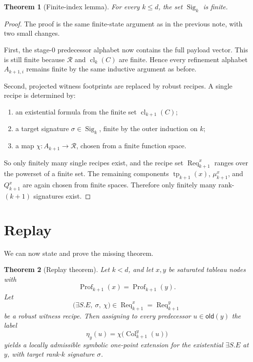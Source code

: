 \documentclass[11pt]{article}
\newtheorem{theorem}{Theorem}[section]
\theoremstyle{definition}
\newcommand{\Roles}{\mathcal{R}}
\newcommand{\cld}[2]{\operatorname{cl}_{#1}(#2)}
\newcommand{\tp}{\operatorname{tp}}
\newcommand{\Prof}{\operatorname{Prof}}
\newcommand{\older}{\mathsf{old}}
\newcommand{\Sig}{\operatorname{Sig}}
\newcommand{\Col}{\operatorname{Col}}
\newcommand{\Req}{\operatorname{Req}}
\begin{document}
\begin{theorem}[Finite-index lemma]\label{thm:finiteindex}
For every $k\le d$, the set $\Sig_k$ is finite.
\end{theorem}

\begin{proof}
The proof is the same finite-state argument as in the previous note, with two small changes.

First, the stage-$0$ predecessor alphabet now contains the full payload vector. This is still finite because $\Roles$ and $\cld{k}{C}$ are finite. Hence every refinement alphabet $A_{k+1,i}$ remains finite by the same inductive argument as before.

Second, projected witness footprints are replaced by robust recipes. A single recipe is determined by:
\begin{enumerate}[label=(\alph*)]
  \item an existential formula from the finite set $\cld{k+1}{C}$;
  \item a target signature $\sigma\in\Sig_k$, finite by the outer induction on $k$;
  \item a map $\chi:A_{k+1}\to\Roles$, chosen from a finite function space.
\end{enumerate}
So only finitely many single recipes exist, and the recipe set $\Req^x_{k+1}$ ranges over the powerset of a finite set. The remaining components $\tp_{k+1}(x)$, $\mu^x_{k+1}$, and $Q^x_{k+1}$ are again chosen from finite spaces. Therefore only finitely many rank-$(k+1)$ signatures exist.
\end{proof}

\section{Replay}

We can now state and prove the missing theorem.

\begin{theorem}[Replay theorem]\label{thm:replay}
Let $k<d$, and let $x,y$ be saturated tableau nodes with
\[
\Prof_{k+1}(x)=\Prof_{k+1}(y).
\]
Let
\[
\bigl(\exists S.E,\ \sigma,\ \chi\bigr)\in \Req^x_{k+1}=\Req^y_{k+1}
\]
be a robust witness recipe. Then assigning to every predecessor $u\in\older(y)$ the label
\[
\eta_y(u)=\chi\bigl(\Col^y_{k+1}(u)\bigr)
\]
yields a locally admissible symbolic one-point extension for the existential $\exists S.E$ at $y$, with target rank-$k$ signature $\sigma$.
\end{theorem}
\end{document}
